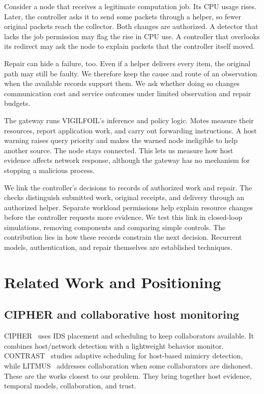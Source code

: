 \documentclass[journal]{IEEEtran}
\begin{document}
Consider a node that receives a legitimate computation job. Its CPU usage rises. Later, the controller asks it to send some packets through a helper, so fewer original packets reach the collector. Both changes are authorized. A detector that lacks the job permission may flag the rise in CPU use. A controller that overlooks its redirect may ask the node to explain packets that the controller itself moved.

Repair can hide a failure, too. Even if a helper delivers every item, the original path may still be faulty. We therefore keep the cause and route of an observation when the available records support them. We ask whether doing so changes communication cost and service outcomes under limited observation and repair budgets.

The gateway runs VIGILFOIL's inference and policy logic. Motes measure their resources, report application work, and carry out forwarding instructions. A host warning raises query priority and makes the warned node ineligible to help another source. The node stays connected. This lets us measure how host evidence affects network response, although the gateway has no mechanism for stopping a malicious process.

We link the controller's decisions to records of authorized work and repair. The checks distinguish submitted work, original receipts, and delivery through an authorized helper. Separate workload permissions help explain resource changes before the controller requests more evidence. We test this link in closed-loop simulations, removing components and comparing simple controls. The contribution lies in how these records constrain the next decision. Recurrent models, authentication, and repair themselves are established techniques.

\section{Related Work and Positioning}
\subsection{CIPHER and collaborative host monitoring}
CIPHER~\cite{sanyal2026cipher} uses IDS placement and scheduling to keep collaborators available. It combines host/network detection with a lightweight behavior monitor. CONTRAST~\cite{contrast} studies adaptive scheduling for host-based mimicry detection, while LITMUS~\cite{sanyal2026litmus} addresses collaboration when some collaborators are dishonest. These are the works closest to our problem. They bring together host evidence, temporal models, collaboration, and trust.
\end{document}
